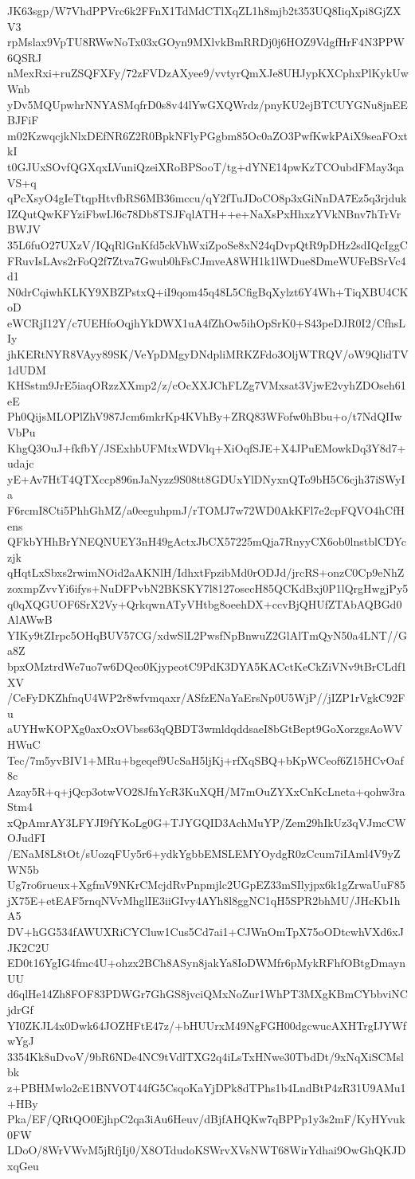 JK63sgp/W7VhdPPVrc6k2FFnX1TdMdCTlXqZL1h8mjb2t353UQ8IiqXpi8GjZXV3
rpMslax9VpTU8RWwNoTx03xGOyn9MXlvkBmRRDj0j6HOZ9VdgfHrF4N3PPW6QSRJ
nMexRxi+ruZSQFXFy/72zFVDzAXyee9/vvtyrQmXJe8UHJypKXCphxPlKykUwWnb
yDv5MQUpwhrNNYASMqfrD0s8v44lYwGXQWrdz/pnyKU2ejBTCUYGNu8jnEEBJFiF
m02KzwqcjkNlxDEfNR6Z2R0BpkNFlyPGgbm85Oc0aZO3PwfKwkPAiX9seaFOxtkI
t0GJUxSOvfQGXqxLVuniQzeiXRoBPSooT/tg+dYNE14pwKzTCOubdFMay3qaVS+q
qPcXsyO4gIeTtqpHtvfbRS6MB36mccu/qY2fTuJDoCO8p3xGiNnDA7Ez5q3rjduk
IZQutQwKFYziFbwIJ6c78Db8TSJFqlATH++e+NaXsPxHhxzYVkNBnv7hTrVrBWJV
35L6fuO27UXzV/IQqRlGnKfd5ckVhWxiZpoSe8xN24qDvpQtR9pDHz2sdIQcIggC
FRuvIsLAvs2rFoQ2f7Ztva7Gwub0hFsCJmveA8WH1k1lWDue8DmeWUFeBSrVc4d1
N0drCqiwhKLKY9XBZPstxQ+iI9qom45q48L5CfigBqXylzt6Y4Wh+TiqXBU4CKoD
eWCRjI12Y/c7UEHfoOqjhYkDWX1uA4fZhOw5ihOpSrK0+S43peDJR0I2/CfhsLIy
jhKERtNYR8VAyy89SK/VeYpDMgyDNdpliMRKZFdo3OljWTRQV/oW9QlidTV1dUDM
KHSstm9JrE5iaqORzzXXmp2/z/cOcXXJChFLZg7VMxsat3VjwE2vyhZDOseh61eE
Ph0QijsMLOPlZhV987Jcm6mkrKp4KVhBy+ZRQ83WFofw0hBbu+o/t7NdQIIwVbPu
KhgQ3OuJ+fkfbY/JSExhbUFMtxWDVlq+XiOqfSJE+X4JPuEMowkDq3Y8d7+udajc
yE+Av7HtT4QTXccp896nJaNyzz9S08tt8GDUxYlDNyxnQTo9bH5C6cjh37iSWyIa
F6rcmI8Cti5PhhGhMZ/a0eeguhpmJ/rTOMJ7w72WD0AkKFl7e2cpFQVO4hCfHens
QFkbYHhBrYNEQNUEY3nH49gActxJbCX57225mQja7RnyyCX6ob0lnstblCDYczjk
qHqtLxSbxs2rwimNOid2aAKNlH/IdhxtFpzibMd0rODJd/jrcRS+onzC0Cp9eNhZ
zoxmpZvvYi6ifys+NuDFPvbN2BKSKY7l8127osecH85QCKdBxj0P1lQrgHwgjPy5
q0qXQGUOF6SrX2Vy+QrkqwnATyVHtbg8oeehDX+ccvBjQHUfZTAbAQBGd0AlAWwB
YIKy9tZIrpc5OHqBUV57CG/xdwSlL2PwsfNpBnwuZ2GlAlTmQyN50a4LNT//Ga8Z
bpxOMztrdWe7uo7w6DQeo0KjypeotC9PdK3DYA5KACctKeCkZiVNv9tBrCLdf1XV
/CeFyDKZhfnqU4WP2r8wfvmqaxr/ASfzENaYaErsNp0U5WjP//jIZP1rVgkC92Fu
aUYHwKOPXg0axOxOVbss63qQBDT3wmldqddsaeI8bGtBept9GoXorzgsAoWVHWuC
Tec/7m5yvBIV1+MRu+bgeqef9UcSaH5ljKj+rfXqSBQ+bKpWCeof6Z15HCvOaf8c
Azay5R+q+jQcp3otwVO28JfnYcR3KuXQH/M7mOuZYXxCnKcLneta+qohw3raStm4
xQpAmrAY3LFYJI9fYKoLg0G+TJYGQID3AchMuYP/Zem29hIkUz3qVJmcCWOJudFI
/ENaM8L8tOt/sUozqFUy5r6+ydkYgbbEMSLEMYOydgR0zCcum7iIAml4V9yZWN5b
Ug7ro6rueux+XgfmV9NKrCMcjdRvPnpmjlc2UGpEZ33mSIlyjpx6k1gZrwaUuF85
jX75E+etEAF5rnqNVvMhglIE3iiGIvy4AYh8l8ggNC1qH5SPR2bhMU/JHcKb1hA5
DV+hGG534fAWUXRiCYCluw1Cus5Cd7ai1+CJWnOmTpX75oODtcwhVXd6xJJK2C2U
ED0t16YgIG4fmc4U+ohzx2BCh8ASyn8jakYa8IoDWMfr6pMykRFhfOBtgDmaynUU
d6qlHe14Zh8FOF83PDWGr7GhGS8jvciQMxNoZur1WhPT3MXgKBmCYbbviNCjdrGf
YI0ZKJL4x0Dwk64JOZHFtE47z/+bHUUrxM49NgFGH00dgcwucAXHTrgIJYWfwYgJ
3354Kk8uDvoV/9bR6NDe4NC9tVdlTXG2q4iLsTxHNwe30TbdDt/9xNqXiSCMslbk
z+PBHMwlo2cE1BNVOT44fG5CsqoKaYjDPk8dTPhs1b4LndBtP4zR31U9AMu1+HBy
Pka/EF/QRtQO0EjhpC2qa3iAu6Heuv/dBjfAHQKw7qBPPp1y3s2mF/KyHYvuk0FW
LDoO/8WrVWvM5jRfjIj0/X8OTdudoKSWrvXVsNWT68WirYdhai9OwGhQKJDxqGeu

